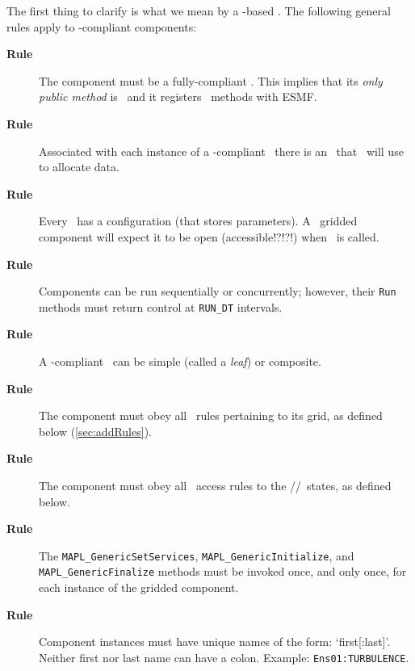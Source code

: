 The first thing to clarify is what we mean by a \ggn-based \egc.
The following general rules apply to \ggn -compliant components:
%
\begin{description}
\item[{\bf Rule \thegenct}] The component must be a fully-compliant \egc.
  This implies that its \emph{only public method} is \ssv\ 
  and it registers \IRF\ methods with ESMF.
  \addtocounter{genct}{1}
  
\item[{\bf Rule \thegenct}] Associated with each instance
  of a \ggn-compliant \egc\  there is an \grd\ that \ggn\ will use to
  allocate data.
  \addtocounter{genct}{1}
  
\item[{\bf Rule \thegenct}] Every \egc\ has a configuration (that stores
  parameters). A \ggn\  gridded
  component will expect it to be open (accessible!?!?!) when \ssv\ is called.
  \addtocounter{genct}{1}
  
\item[{\bf Rule \thegenct}] Components can be run sequentially or
  concurrently; however, their \texttt{Run} methods must return control at
  {\tt RUN\_DT} intervals.
  \addtocounter{genct}{1}
  
\item[{\bf Rule \thegenct}]  A \ggn-compliant \egc\ can be simple (called a
  \emph{leaf}) or composite.
  \addtocounter{genct}{1}
  
\item[{\bf Rule \thegenct}] The component must obey all \ggn\   rules 
  pertaining to its grid, as defined below (\ref{sec:addRules}).
  \addtocounter{genct}{1}

\item[{\bf Rule \thegenct}] The component must obey all \ggn\  access rules
  to the \IM/\EX/\gIN\  states, as defined below.
  \addtocounter{genct}{1}

\item[{\bf Rule \thegenct}] The {\tt MAPL\_GenericSetServices}, 
  {\tt MAPL\_GenericInitialize}, and {\tt MAPL\_GenericFinalize}
  methods must be invoked once, and only once, for each instance of
  the gridded component.
  \addtocounter{genct}{1}

\item[{\bf Rule \thegenct}] Component instances must have unique names 
  of the form: `first[:last]'. Neither first nor last name can have a
  colon. Example: {\tt Ens01:TURBULENCE}.
  \addtocounter{genct}{1}
  
\end{description}

